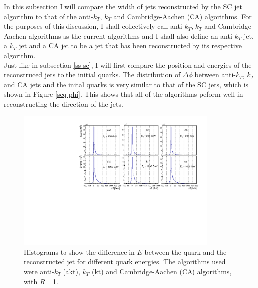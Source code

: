 \documentclass[a4paper,11pt, onecolumn]{article}
\begin{document}
  In this subsection I will compare the width of jets reconstructed by the SC jet algorithm to that of the anti-$k_{T}$, $k_{T}$ 
  and Cambridge-Aachen (CA) algorithms. For the purposes of this discussion, I shall collectively call anti-$k_{T}$, $k_{T}$
  and Cambridge-Aachen algorithms as the current algorithms and I shall also define an anti-$k_T$ jet, a $k_T$ jet and a CA jet to be a jet
  that has been reconstructed by its respective algorithm. \\

  Just like in subsection \ref{ss sc}, I will first compare the position and energies
  of the reconstruced jets to the initial quarks. The distribution of $\Delta\phi$ between anti-$k_{T}$, $k_{T}$ and CA jets and the inital quarks
  is very similar to that of the SC jets, which is shown in Figure \ref{scq phi}. This shows that all of the algorithms peform well in reconstructing
  the direction of the jets.

  \begin{figure}[!htb]
    \begin{center}
      \includegraphics[width = 0.87\textwidth]{jetq_E}
      \caption{Histograms to show the difference in $E$ between the quark and the reconstructed 
               jet for different quark energies. The algorithms used were anti-$k_{T}$ (akt), $k_{T}$ (kt) 
               and Cambridge-Aachen (CA) algorithms, with $R$ =1.}
      \label{jetq E}
    \end{center}
  \end{figure}
\end{document}
